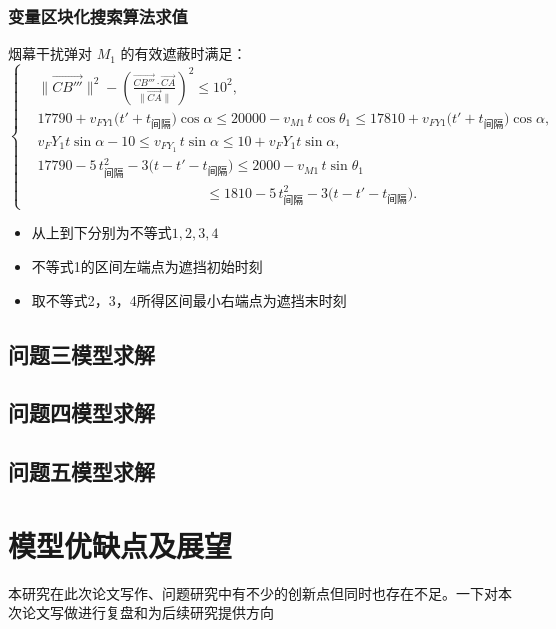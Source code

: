 \documentclass{article}
\begin{document}
\subsubsection{变量区块化搜索算法求值}
\begin{center}
烟幕干扰弹对 $M_1$ 的有效遮蔽时满足：
\[
\left\{
\begin{aligned}
&\bigl\|\overrightarrow{CB'''}\bigr\|^{2}
- \left(\frac{\overrightarrow{CB'''}\cdot\overrightarrow{CA}}{\|\overrightarrow{CA}\|}\right)^{2}
\le 10^{2}, \\[4pt]
&17790+v_{FY1}\bigl(t'+t_{\text{间隔}}\bigr)\cos\alpha
\le 20000 - v_{M1}\,t\cos\theta_1
\le 17810+v_{FY1}\bigl(t'+t_{\text{间隔}}\bigr)\cos\alpha, \\[4pt]
&v_FY_1 t \sin\alpha-10 \le v_{FY_1}\,t\sin\alpha \le 10+v_FY_1 t \sin \alpha
, \\[4pt]
&17790-5\,t_{\text{间隔}}^{2}-3\bigl(t-t'-t_{\text{间隔}}\bigr)
\le 2000 - v_{M1}\,t\sin\theta_1 \\ 
&\qquad\qquad\qquad\qquad\qquad\qquad
\le 1810-5\,t_{\text{间隔}}^{2}-3\bigl(t-t'-t_{\text{间隔}}\bigr).
\end{aligned}
\right.
\]
\end{center}


\begin{itemize}
    \item 从上到下分别为不等式$1,2,3,4$
    \item 不等式1的区间左端点为遮挡初始时刻
    \item 取不等式2，3，4所得区间最小右端点为遮挡末时刻
\end{itemize}
\subsection{问题三模型求解}

\subsection{问题四模型求解}

\subsection{问题五模型求解}

\section{模型优缺点及展望}
本研究在此次论文写作、问题研究中有不少的创新点但同时也存在不足。一下对本次论文写做进行复盘和为后续研究提供方向
\end{document}
